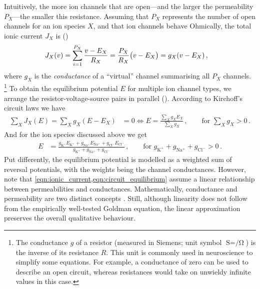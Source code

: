 Intuitively, the more ion channels that are open---and the larger the permeability $P_X$---the smaller this resistance.
Assuming that $P_X$ represents the number of open channels for an ion species $X$, and that ion channels behave Ohmically, the total ionic current $J_X$ is  ()
\begin{align}
	J_X(v) &= \sum_{i = 1}^{P_X} \frac{{v} - E_X}{R_X} = \frac{P_X}{R_X} \bigl( {v} - E_X \bigr) = g_X ({v} - E_X)\,,
	\label{eqn:ionic_current}
\end{align}
where $g_X$ is the \emph{conductance} of a \enquote{virtual} channel summarising all $P_X$ channels.%
\footnote{The conductance $g$ of a resistor (measured in Siemens; unit symbol $\si{\siemens} = \si{\per\ohm}$) is the inverse of its resistance $R$.
This unit is commonly used in neuroscience to simplify some equations.
For example, a conductance of zero can be used to describe an open circuit, whereas resistances would take on unwieldy infinite values in this case.}
To obtain the equilibrium potential $E$ for multiple ion channel types, we arrange the resistor-voltage-source pairs in parallel ().
According to Kirchoff's circuit laws we have
\begin{align}
	\sum_X J_X(E) = \sum_X g_X (E - E_X) &= 0 \Leftrightarrow E = \frac{\sum_X g_X E_X}{\sum_X g_X} \,, \quad \quad \text{for } \sum_X g_X > 0 \,.
	\label{eqn:circuit_equilibrium}
\end{align}
And for the ion species discussed above we get
\begin{align}
	E &= \frac{g_\mathrm{K^+} E_\mathrm{K^+} + g_\mathrm{Na^+} E_\mathrm{Na^+} + g_\mathrm{Cl^-} E_\mathrm{Cl^-}}{g_\mathrm{K^+} + g_\mathrm{Na^+} + g_\mathrm{Cl^-}} \,,  \quad \quad \text{for } g_\mathrm{K^+} + g_\mathrm{Na^+} + g_\mathrm{Cl^-} > 0 \,.
	\label{eqn:circuit_equilibrium_ions}
\end{align}
Put differently, the equilibrium potential is modelled as a weighted sum of reversal potentials, with the weights being the channel conductances.
However, note that \cref{eqn:ionic_current,eqn:circuit_equilibrium} assume a linear relationship between permeabilities and conductances.
Mathematically, conductance and permeability are two distinct concepts \citep{enderle2011bioelectric}.
Still, although linearity does not follow from the empirically well-tested Goldman equation, the linear approximation preserves the overall qualitative behaviour.%

